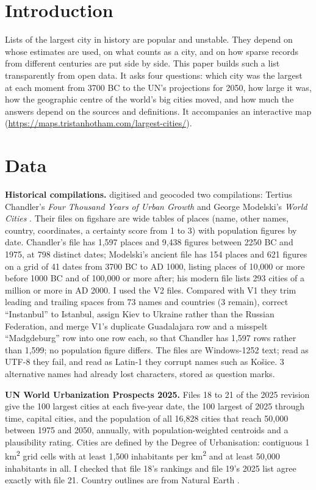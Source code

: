 \documentclass[11pt,a4paper]{article}
\begin{document}
\section{Introduction}
Lists of the largest city in history are popular and unstable. They depend on whose estimates are used, on what counts as a city, and on how sparse records from different centuries are put side by side. This paper builds such a list transparently from open data. It asks four questions: which city was the largest at each moment from 3700 BC to the UN's projections for 2050, how large it was, how the geographic centre of the world's big cities moved, and how much the answers depend on the sources and definitions. It accompanies an interactive map (\url{https://maps.tristanhotham.com/largest-cities/}).

\section{Data}
\textbf{Historical compilations.} \citet{reba} digitised and geocoded two compilations: Tertius Chandler's \textit{Four Thousand Years of Urban Growth} \citep{chandler} and George Modelski's \textit{World Cities} \citep{modelski}. Their files on figshare \citep{figc,figa,figm} are wide tables of places (name, other names, country, coordinates, a certainty score from 1 to 3) with population figures by date. Chandler's file has 1,597 places and 9,438 figures between 2250 BC and 1975, at 798 distinct dates; Modelski's ancient file has 154 places and 621 figures on a grid of 41 dates from 3700 BC to AD 1000, listing places of 10,000 or more before 1000 BC and of 100,000 or more after; his modern file lists 293 cities of a million or more in AD 2000. I used the V2 files. Compared with V1 they trim leading and trailing spaces from 73 names and countries (3 remain), correct ``Instanbul'' to Istanbul, assign Kiev to Ukraine rather than the Russian Federation, and merge V1's duplicate Guadalajara row and a misspelt ``Madgdeburg'' row into one row each, so that Chandler has 1,597 rows rather than 1,599; no population figure differs. The files are Windows-1252 text; read as UTF-8 they fail, and read as Latin-1 they corrupt names such as Košice. 3 alternative names had already lost characters, stored as question marks.

\textbf{UN World Urbanization Prospects 2025.} Files 18 to 21 of the 2025 revision \citep{wup} give the 100 largest cities at each five-year date, the 100 largest of 2025 through time, capital cities, and the population of all 16,828 cities that reach 50,000 between 1975 and 2050, annually, with population-weighted centroids and a plausibility rating. Cities are defined by the Degree of Urbanisation: contiguous 1 km\textsuperscript{2} grid cells with at least 1,500 inhabitants per km\textsuperscript{2} and at least 50,000 inhabitants in all. I checked that file 18's rankings and file 19's 2025 list agree exactly with file 21. Country outlines are from Natural Earth \citep{ne}.
\end{document}
